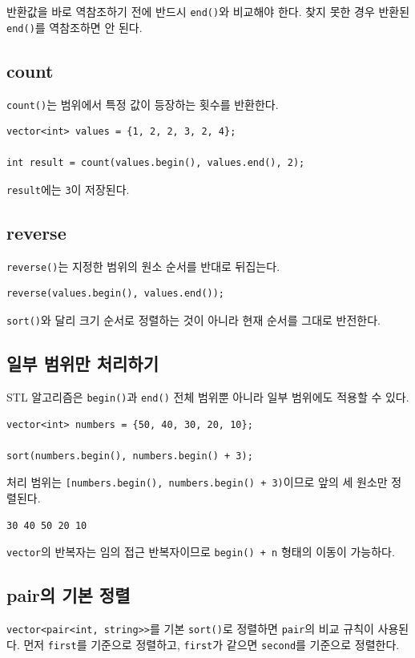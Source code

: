 \documentclass[11pt,a4paper]{article}
\begin{document}
반환값을 바로 역참조하기 전에 반드시 \texttt{end()}와 비교해야 한다. 찾지 못한 경우 반환된 \texttt{end()}를 역참조하면 안 된다.

\subsection{count}
\texttt{count()}는 범위에서 특정 값이 등장하는 횟수를 반환한다.

\begin{lstlisting}
vector<int> values = {1, 2, 2, 3, 2, 4};

int result = count(values.begin(), values.end(), 2);
\end{lstlisting}

\texttt{result}에는 \texttt{3}이 저장된다.

\subsection{reverse}
\texttt{reverse()}는 지정한 범위의 원소 순서를 반대로 뒤집는다.

\begin{lstlisting}
reverse(values.begin(), values.end());
\end{lstlisting}

\texttt{sort()}와 달리 크기 순서로 정렬하는 것이 아니라 현재 순서를 그대로 반전한다.

\subsection{일부 범위만 처리하기}
STL 알고리즘은 \texttt{begin()}과 \texttt{end()} 전체 범위뿐 아니라 일부 범위에도 적용할 수 있다.

\begin{lstlisting}
vector<int> numbers = {50, 40, 30, 20, 10};

sort(numbers.begin(), numbers.begin() + 3);
\end{lstlisting}

처리 범위는 \texttt{[numbers.begin(), numbers.begin() + 3)}이므로 앞의 세 원소만 정렬된다.

\begin{verbatim}
30 40 50 20 10
\end{verbatim}

\texttt{vector}의 반복자는 임의 접근 반복자이므로 \texttt{begin() + n} 형태의 이동이 가능하다.

\subsection{pair의 기본 정렬}
\texttt{vector<pair<int, string>>}를 기본 \texttt{sort()}로 정렬하면 \texttt{pair}의 비교 규칙이 사용된다. 먼저 \texttt{first}를 기준으로 정렬하고, \texttt{first}가 같으면 \texttt{second}를 기준으로 정렬한다.
\end{document}
